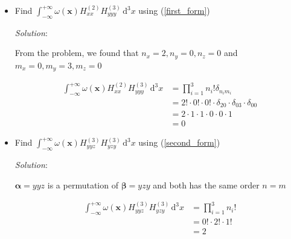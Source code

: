 \documentclass[draft]{article}
\begin{document}
\begin{itemize}
	\item[1.] Find $\int_{-\infty}^{+\infty} \omega(\bm{x}) H^{(2)}_{xx} H^{(3)}_{yyy} \, \text{d}^3 x$ using (\ref{first_form})
	
	          \textit{Solution}:
	          
	          \hspace{2em} From the problem, we found that $n_x = 2, n_y = 0, n_z = 0$ and $m_x = 0, m_y = 3, m_z = 0$
	          
	          \hspace{2em} 
	          \begin{align*}
	          \int_{-\infty}^{+\infty} \omega(\bm{x}) H^{(2)}_{xx} H^{(3)}_{yyy} \, \text{d}^3 x &= \prod_{i=1}^{3} n_i! \delta_{n_i m_i} \\
	          	                                                                                 &= 2! \cdot 0! \cdot 0! \cdot \delta_{20} \cdot \delta_{03} \cdot \delta_{00} \\
	          	                                                                                 &= 2 \cdot 1 \cdot 1 \cdot 0 \cdot 0 \cdot 1 \\
	          	                                                                                 &= 0
	          \end{align*}
	          
	\item[2.] Find $\int_{-\infty}^{+\infty} \omega(\bm{x}) H^{(3)}_{yyz} H^{(3)}_{yzy} \, \text{d}^3 x$ using (\ref{second_form})
	
		      \textit{Solution}:
	
			  \hspace{2em} $\bm{\alpha} = yyz$ is a permutation of $\bm{\beta} = yzy$ and both has the same order $n = m$
	
	          \hspace{2em} 
	          \begin{align*}
	          \int_{-\infty}^{+\infty} \omega(\bm{x}) H^{(3)}_{yyz} H^{(3)}_{yzy} \, \text{d}^3 x &= \prod_{i=1}^{3} n_i! \\
		                                                                                          &= 0! \cdot 2! \cdot 1! \\
		                                                                                          &= 2
		      \end{align*}
\end{itemize}
\end{document}
